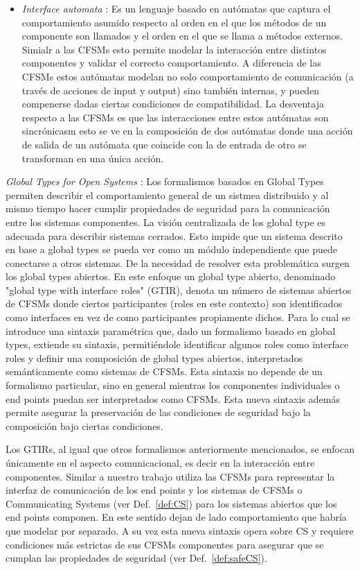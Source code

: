 \begin{itemize}
\item \emph{Interface automata} \cite{dealfaro:esec-fse-01}: Es un lenguaje basado en autómatas que captura el comportamiento asumido respecto al orden en el que los métodos de un componente son llamados y el orden en el que se llama a métodos externos. Simialr a las CFSMs esto permite modelar la interacción entre distintos componentes y validar el correcto comportamiento. A diferencia de las CFSMs estos autómatas modelan no solo comportamiento de comunicación (a través de acciones de input y output) sino también internas, y pueden compenerse dadas ciertas condiciones de compatibilidad. La desventaja respecto a las CFSMs es que las interacciones entre estos autómatas son sincrónicasm esto se ve en la composición de dos autómatas donde una acción de salida de un autómata que coincide con la de entrada de otro se transforman en una única acción.
\end{itemize}

\emph{Global Types for Open Systems} \cite{barbanera:eptcs279}: Los formalismos basados en Global Types permiten describir el comportamiento general de un sistmea distribuido y al mismo tiempo hacer cumplir propiedades de seguridad para la comunicación entre los sistemas componentes. La visión centralizada de los global type es adecuada para describir sistemas cerrados. Esto impide que un sistema descrito en base a global types se pueda ver como un módulo independiente que puede conectarse a otros sistemas. De la necesidad de resolver esta problemática surgen los global types abiertos. En este enfoque un global type abierto, denominado "global type with interface roles" (GTIR), denota un número de sistemas abiertos de CFSMs donde ciertos participantes (roles en este contexto) son identificados como interfaces en vez de como participantes propiamente dichos. Para lo cual se introduce una sintaxis paramétrica que, dado un formalismo basado en global types, extiende su sintaxis, permitiéndole identificar algunos roles como interface roles y definir una composición de global types abiertos, interpretados semánticamente como sistemas de CFSMs. Esta sintaxis no depende de un formalismo particular, sino en general mientras los componentes individuales o end points puedan ser interpretados como  CFSMs. Esta nueva sintaxis además permite asegurar la preservación de las condiciones de seguridad bajo la composición bajo ciertas condiciones.

Los GTIRs, al igual que otros formalismos anteriormente mencionados, se enfocan únicamente en el aspecto comunicacional, es decir en la interacción entre componentes. Similar a nuestro trabajo utiliza las CFSMs para representar la interfaz de comunicación de los end points y los sistemas de CFSMs o Communicating Systems (ver Def.~\ref{def:CS}) para los sistemas abiertos que los end points componen. En este sentido dejan de lado comportamiento que habría que modelar por separado. A su vez esta nueva sintaxis opera sobre CS y requiere condiciones más estrictas de sus CFSMs componentes para asegurar que se cumplan las propiedades de seguridad (ver Def.~\ref{def:safeCS}).